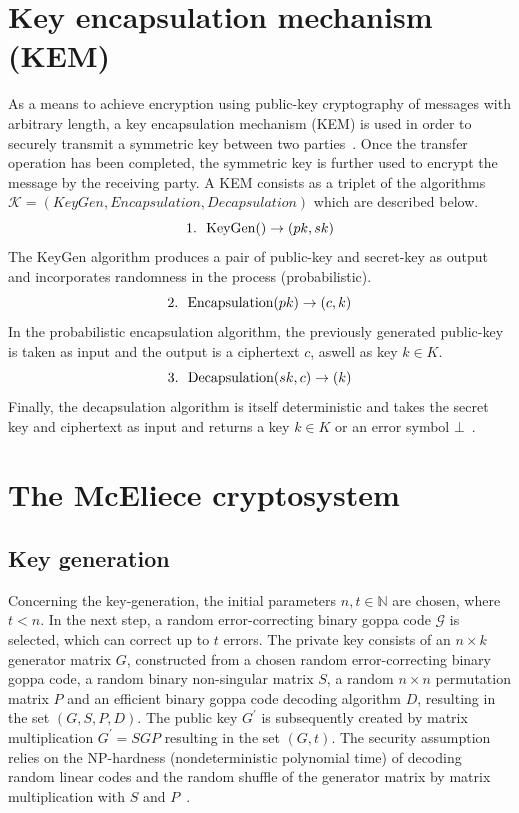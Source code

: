 \documentclass[11pt,
  oneside,openany,    %
]{scrreprt}
\begin{document}
\section{Key encapsulation mechanism (KEM)}
As a means to achieve encryption using public-key cryptography of messages with arbitrary length, a key encapsulation mechanism (KEM) is used in order to securely transmit a symmetric key between two parties~\cite{Coretti2013}. Once the transfer operation has been completed, the symmetric key is further used to encrypt the message by the receiving party.
A KEM consists as a triplet of the algorithms $\mathcal{K} = (KeyGen, Encapsulation, Decapsulation)$ which are described below.
\begin{equation*}
    1. \ \ \text{KeyGen()} \rightarrow (pk, sk)\\
\end{equation*}
The KeyGen algorithm produces a pair of public-key and secret-key as output and incorporates randomness in the process (probabilistic).
\begin{equation*}
2. \ \ \text{Encapsulation($pk$)} \rightarrow (c, k)\\
\end{equation*}
In the probabilistic encapsulation algorithm, the previously generated public-key is taken as input and the output is a ciphertext $c$, aswell as key $k \in K$.
\begin{equation*}
3. \ \ \text{Decapsulation($sk, c$)} \rightarrow (k)\\
\end{equation*}
Finally, the decapsulation algorithm is itself deterministic and takes the secret key and ciphertext as input and returns a key $k \in K$ or an error symbol $\bot$~\cite{saitoYamakawa, BindelBrendlFischlin}.

\section{The McEliece cryptosystem}
\label{sec:mceliece_crypto}

\subsection{Key generation}
Concerning the key-generation, the initial parameters $n, t \in \mathbb{N}$ are chosen, where $t < n$. In the next step, a random error-correcting binary goppa code $\mathcal{G}$ is selected, which can correct up to $t$ errors.
The private key consists of an $n \times k$ generator matrix $G$, constructed from a chosen random error-correcting binary goppa code, a random binary non-singular matrix $S$, a random $n \times n$ permutation matrix $P$ and an efficient binary goppa code decoding algorithm $D$, resulting in the set $(G, S, P, D)$. The public key $G^{\prime}$ is subsequently created by matrix multiplication $G^{\prime} = SGP$ resulting in the set $(G, t)$. The security assumption relies on the NP-hardness (nondeterministic polynomial time) of decoding random linear codes and the random shuffle of the generator matrix by matrix multiplication with $S$ and $P$~\cite{robertmceliece, NP_berlekamp, bernsteinLange, engelbertOverbeckSchmidt}.
\end{document}
